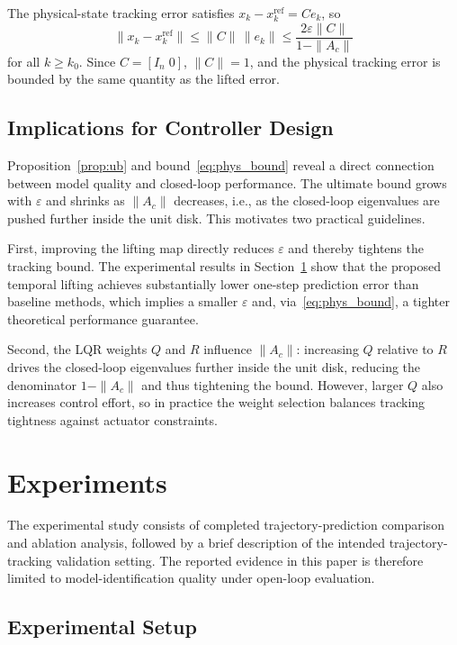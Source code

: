 \documentclass[journal]{IEEEtran}
\begin{document}
The physical-state tracking error satisfies $x_k - x_k^{\mathrm{ref}} = Ce_k$, so
\begin{equation}
    \|x_k - x_k^{\mathrm{ref}}\| \leq \|C\|\,\|e_k\| \leq \frac{2\varepsilon\|C\|}{1-\|A_c\|}
    \label{eq:phys_bound}
\end{equation}
for all $k \geq k_0$. Since $C = [I_n\;0]$, $\|C\| = 1$, and the physical tracking error is bounded by the same quantity as the lifted error.

\subsection{Implications for Controller Design}

Proposition~\ref{prop:ub} and bound~\eqref{eq:phys_bound} reveal a direct connection between model quality and closed-loop performance. The ultimate bound grows with $\varepsilon$ and shrinks as $\|A_c\|$ decreases, i.e., as the closed-loop eigenvalues are pushed further inside the unit disk. This motivates two practical guidelines.

First, improving the lifting map directly reduces $\varepsilon$ and thereby tightens the tracking bound. The experimental results in Section~\ref{sec:experiments} show that the proposed temporal lifting achieves substantially lower one-step prediction error than baseline methods, which implies a smaller $\varepsilon$ and, via~\eqref{eq:phys_bound}, a tighter theoretical performance guarantee.

Second, the LQR weights $Q$ and $R$ influence $\|A_c\|$: increasing $Q$ relative to $R$ drives the closed-loop eigenvalues further inside the unit disk, reducing the denominator $1 - \|A_c\|$ and thus tightening the bound. However, larger $Q$ also increases control effort, so in practice the weight selection balances tracking tightness against actuator constraints.

\section{Experiments}
\label{sec:experiments}

The experimental study consists of completed trajectory-prediction comparison and ablation analysis, followed by a brief description of the intended trajectory-tracking validation setting. The reported evidence in this paper is therefore limited to model-identification quality under open-loop evaluation.

\subsection{Experimental Setup}
\end{document}
